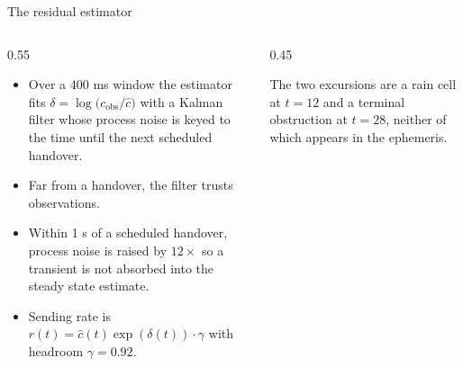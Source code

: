 \documentclass[aspectratio=169,10pt]{beamer}
\begin{document}
\begin{frame}{The residual estimator}
  \begin{columns}[T]
    \begin{column}{0.55\textwidth}
      \begin{itemize}
        \item<1-> Over a 400 ms window the estimator fits
          $\delta = \log\bigl(c_{\text{obs}} / \hat{c}\bigr)$ with a Kalman filter whose
          process noise is keyed to the time until the next scheduled handover.
        \item<2-> Far from a handover, the filter trusts observations.
        \item<3-> Within 1 s of a scheduled handover, process noise is raised by $12\times$ so a
          transient is not absorbed into the steady state estimate.
        \item<4-> Sending rate is $r(t) = \hat{c}(t)\exp(\delta(t)) \cdot \gamma$ with headroom
          $\gamma = 0.92$.
      \end{itemize}
    \end{column}
    \begin{column}{0.45\textwidth}
      \centering
      \scriptsize The two excursions are a rain cell at $t=12$ and a terminal obstruction at $t=28$,
      neither of which appears in the ephemeris.
    \end{column}
  \end{columns}
\end{frame}
\end{document}
